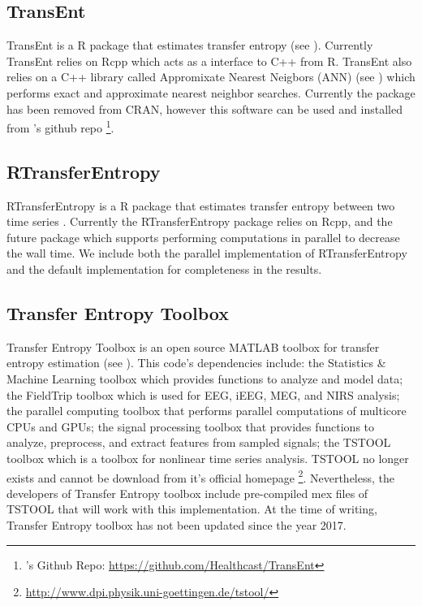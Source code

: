 \subsection{TransEnt}
TransEnt is a R package that estimates transfer entropy (see \cite{TransEnt}). Currently TransEnt relies on Rcpp which acts as a interface to C++ from R. TransEnt also relies on  a C++ library called Appromixate Nearest Neigbors (ANN) (see \cite{ANN}) which performs exact and approximate nearest neighbor searches. Currently the package has been removed from CRAN, however this software can be used and installed from \cite{TransEnt}'s github repo \footnote{\cite{TransEnt}'s Github Repo: \url{https://github.com/Healthcast/TransEnt}}.

\subsection{RTransferEntropy}
RTransferEntropy is a R package that estimates transfer entropy between two time series \cite{RTransferEntropy}. Currently the RTransferEntropy package relies on Rcpp, and the future package which supports performing computations in parallel to decrease the wall time. We include both the parallel implementation of RTransferEntropy and the default implementation for completeness in the results.

\subsection{Transfer Entropy Toolbox}

Transfer Entropy Toolbox  is an open source MATLAB toolbox for transfer entropy estimation (see \cite{TransferEntropyToolbox}). This code's dependencies include: the Statistics \& Machine Learning toolbox  which provides functions to analyze and model data; the FieldTrip toolbox which is used for EEG, iEEG, MEG, and NIRS analysis; the parallel computing toolbox that performs parallel computations of multicore CPUs and GPUs; the signal processing toolbox that provides functions to analyze, preprocess, and extract features from sampled signals; the TSTOOL toolbox which is a toolbox for nonlinear time series analysis. TSTOOL no longer exists and cannot be download from it's official homepage \footnote{\url{http://www.dpi.physik.uni-goettingen.de/tstool/}}. Nevertheless, the developers of Transfer Entropy toolbox include pre-compiled mex files of TSTOOL that will work with this implementation. At the time of writing,  Transfer Entropy toolbox has not been updated since the year 2017.

